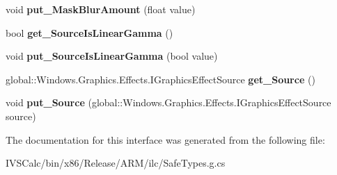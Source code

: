 \begin{DoxyCompactItemize}
void {\bfseries put\+\_\+\+Mask\+Blur\+Amount} (float value)
\item 
\mbox{\label{interface_microsoft_1_1_graphics_1_1_canvas_1_1_effects_1_1_i_highlights_and_shadows_effect_aebfc3fe25208f614855fe07689adc28b}} 
bool {\bfseries get\+\_\+\+Source\+Is\+Linear\+Gamma} ()
\item 
\mbox{\label{interface_microsoft_1_1_graphics_1_1_canvas_1_1_effects_1_1_i_highlights_and_shadows_effect_ab3368ef53a06d8ede878c2e0dacdd8be}} 
void {\bfseries put\+\_\+\+Source\+Is\+Linear\+Gamma} (bool value)
\item 
\mbox{\label{interface_microsoft_1_1_graphics_1_1_canvas_1_1_effects_1_1_i_highlights_and_shadows_effect_a83fcc70ce10f7abd471c53cec2470d71}} 
global\+::\+Windows.\+Graphics.\+Effects.\+I\+Graphics\+Effect\+Source {\bfseries get\+\_\+\+Source} ()
\item 
\mbox{\label{interface_microsoft_1_1_graphics_1_1_canvas_1_1_effects_1_1_i_highlights_and_shadows_effect_acea3a72367afb482d6ce0f8e000dfc70}} 
void {\bfseries put\+\_\+\+Source} (global\+::\+Windows.\+Graphics.\+Effects.\+I\+Graphics\+Effect\+Source source)
\end{DoxyCompactItemize}


The documentation for this interface was generated from the following file\+:\begin{DoxyCompactItemize}
\item 
I\+V\+S\+Calc/bin/x86/\+Release/\+A\+R\+M/ilc/Safe\+Types.\+g.\+cs\end{DoxyCompactItemize}
